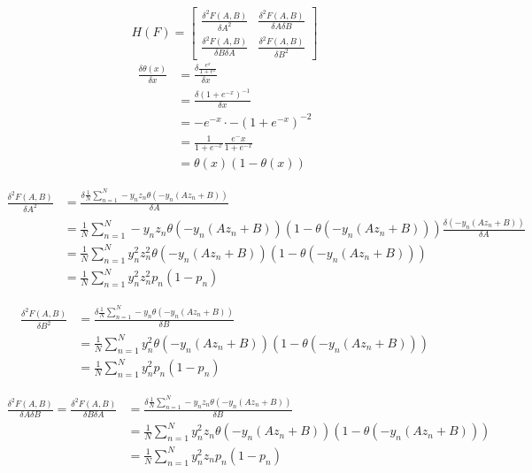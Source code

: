 \documentclass[12pt]{article}
\begin{document}
$$
H(F) = 
\begin{bmatrix}
    \frac{\delta^2 F(A, B)}{\delta A^2} & \frac{\delta^2 F(A, B)}{\delta A \delta B} \\
    \frac{\delta^2 F(A, B)}{\delta B \delta A} & \frac{\delta^2 F(A, B)}{\delta B^2}
\end{bmatrix}
$$
\begin{equation*}
\begin{split}
    \frac{\delta \theta(x)}{\delta x} &= \frac{\delta \frac{e^x}{1+e^x}}{\delta x} \\
    &= \frac{\delta (1+e^{-x})^{-1}}{\delta x} \\
    &= -e^{-x} \cdot -(1+e^{-x})^{-2} \\
    &= \frac{1}{1+e^{-x}} \frac{e^-x}{1+e^{-x}} \\
    &= \theta(x) (1 - \theta(x))
\end{split}
\end{equation*}

\begin{equation*}
    \begin{split}
        \frac{\delta^2 F(A, B)}{\delta A^2} &= \frac{ \delta \frac{1}{N} \sum_{n=1}^N -y_nz_n \theta(-y_n(Az_n+B))}{\delta A} \\
        &= \frac{1}{N} \sum_{n=1}^N -y_nz_n \theta(-y_n(Az_n+B)) (1 - \theta(-y_n(Az_n+B))) \frac{\delta (-y_n (Az_n + B))}{\delta A} \\
        &= \frac{1}{N} \sum_{n=1}^N y_n^2z_n^2 \theta(-y_n(Az_n+B)) (1 - \theta(-y_n(Az_n+B))) \\
        &= \frac{1}{N} \sum_{n=1}^N y_n^2z_n^2 p_n (1-p_n)
    \end{split}
\end{equation*}

\begin{equation*}
    \begin{split}
        \frac{\delta^2 F(A, B)}{\delta B^2} &= \frac{ \delta \frac{1}{N} \sum_{n=1}^N -y_n \theta(-y_n(Az_n+B))}{\delta B} \\
        &= \frac{1}{N} \sum_{n=1}^N y_n^2 \theta(-y_n(Az_n+B)) (1 - \theta(-y_n(Az_n+B))) \\
        &= \frac{1}{N} \sum_{n=1}^N y_n^2 p_n (1-p_n)
    \end{split}
\end{equation*}

\begin{equation*}
    \begin{split}
        \frac{\delta^2 F(A, B)}{\delta A \delta B} = \frac{\delta^2 F(A, B)}{\delta B \delta A} &= \frac{ \delta \frac{1}{N} \sum_{n=1}^N -y_nz_n \theta(-y_n(Az_n+B))}{\delta B} \\
        &= \frac{1}{N} \sum_{n=1}^N y_n^2 z_n\theta(-y_n(Az_n+B)) (1 - \theta(-y_n(Az_n+B))) \\
        &= \frac{1}{N} \sum_{n=1}^N y_n^2 z_n p_n (1-p_n)
    \end{split}
\end{equation*}
\end{document}
